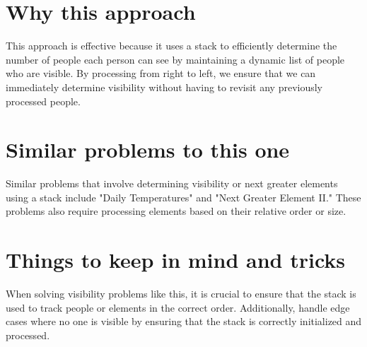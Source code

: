 \section*{Why this approach}

This approach is effective because it uses a stack to efficiently determine the number of people each person can see by maintaining a dynamic list of people who are visible. By processing from right to left, we ensure that we can immediately determine visibility without having to revisit any previously processed people.

\section*{Similar problems to this one}

Similar problems that involve determining visibility or next greater elements using a stack include "Daily Temperatures" and "Next Greater Element II." These problems also require processing elements based on their relative order or size.

\section*{Things to keep in mind and tricks}

When solving visibility problems like this, it is crucial to ensure that the stack is used to track people or elements in the correct order. Additionally, handle edge cases where no one is visible by ensuring that the stack is correctly initialized and processed.